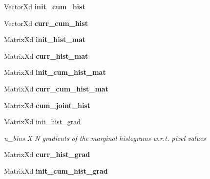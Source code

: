 \begin{DoxyCompactItemize}
\item 
\hypertarget{classCCRE_a2c43cee0ffbb540dd735d8ce805942a2}{Vector\-Xd {\bfseries init\-\_\-cum\-\_\-hist}}\label{classCCRE_a2c43cee0ffbb540dd735d8ce805942a2}

\item 
\hypertarget{classCCRE_af8538160dbb6848eee1b6cd9b1f4e788}{Vector\-Xd {\bfseries curr\-\_\-cum\-\_\-hist}}\label{classCCRE_af8538160dbb6848eee1b6cd9b1f4e788}

\item 
\hypertarget{classCCRE_aaba3d5a34118b0294dd716b39fec2023}{Matrix\-Xd {\bfseries init\-\_\-hist\-\_\-mat}}\label{classCCRE_aaba3d5a34118b0294dd716b39fec2023}

\item 
\hypertarget{classCCRE_aa156f513feb2faac94befeba89efe10e}{Matrix\-Xd {\bfseries curr\-\_\-hist\-\_\-mat}}\label{classCCRE_aa156f513feb2faac94befeba89efe10e}

\item 
\hypertarget{classCCRE_adbc7633506a0567f791cbae97e69cfbf}{Matrix\-Xd {\bfseries init\-\_\-cum\-\_\-hist\-\_\-mat}}\label{classCCRE_adbc7633506a0567f791cbae97e69cfbf}

\item 
\hypertarget{classCCRE_a7d4cb88fcd5fd88a7132de4a538a4bfb}{Matrix\-Xd {\bfseries curr\-\_\-cum\-\_\-hist\-\_\-mat}}\label{classCCRE_a7d4cb88fcd5fd88a7132de4a538a4bfb}

\item 
\hypertarget{classCCRE_a481007f939c43ae813a3a4d222fd0852}{Matrix\-Xd {\bfseries cum\-\_\-joint\-\_\-hist}}\label{classCCRE_a481007f939c43ae813a3a4d222fd0852}

\item 
\hypertarget{classCCRE_a09ce115f1eb533a2a7532672cd85d218}{Matrix\-Xd \hyperlink{classCCRE_a09ce115f1eb533a2a7532672cd85d218}{init\-\_\-hist\-\_\-grad}}\label{classCCRE_a09ce115f1eb533a2a7532672cd85d218}

\begin{DoxyCompactList}\small\item\em n\-\_\-bins X N gradients of the marginal histograms w.\-r.\-t. pixel values \end{DoxyCompactList}\item 
\hypertarget{classCCRE_a9282d15b8d7022acb34b1d3818fb95bb}{Matrix\-Xd {\bfseries curr\-\_\-hist\-\_\-grad}}\label{classCCRE_a9282d15b8d7022acb34b1d3818fb95bb}

\item 
\hypertarget{classCCRE_acef298fae49c3d1468d2eb6b06ad70ef}{Matrix\-Xd {\bfseries init\-\_\-cum\-\_\-hist\-\_\-grad}}\label{classCCRE_acef298fae49c3d1468d2eb6b06ad70ef}


\end{DoxyCompactItemize}
